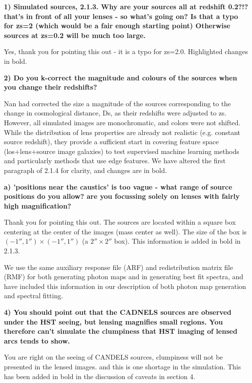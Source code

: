 \documentclass{article}
\begin{document}
\vspace{0.5cm}

{\bf 1) Simulated sources, 2.1.3. Why are your sources all at redshift 0.2?!? that's
in front of all your lenses - so what's going on? Is that a typo for zs=2
(which would be a fair enough starting point) Otherwise sources at zs=0.2
will be much too large.}

Yes, thank you for pointing this out - it is a typo for zs=2.0.
Highlighted changes in bold.


{\bf 
2) Do you k-correct the magnitude and colours of the sources when you
change their redshifts?
}

Nan had corrected the size a magnitude of the sources corresponding to
the change in cosmological distance, Ds, as their redshifts were
adjusted to zs.  However, all simulated images are monochromatic, and
colors were not shifted.  While the distribution of lens properties
are already not realistic (e.g. constant source redshift), they
provide a sufficient start in covering feature space (los+lens+source
image galaxies) to test supervised machine learning methods and
particularly methods that use edge features.  We have altered the
first paragraph of 2.1.4 for clarity, and changes are in bold.


{\bf 
a) 'positions near the caustics' is too vague - what range of source positions
do you allow? are you focussing solely on lenses with fairly high
magnification?
}

Thank you for pointing this out.  The sources are located within a
square box centering at the center of the images (mass center as
well). The size of the box is $(-1'', 1'')\times(-1'', 1'')$ (a
$2''\times2''$ box).  This information is added in bold in 2.1.3.

We use the same auxiliary response file (ARF) and redistribution matrix file
(RMF) for both generating photon maps and in generating best fit
spectra, and have included this information in our description of both
photon map generation and spectral fitting.

{\bf 4) You should point out that the CADNELS sources are observed
  under the HST seeing, but lensing magnifies small regions. You
  therefore can't simulate the clumpiness that HST imaging of lensed
  arcs tends to show.  }

You are right on the seeing of CANDELS sources, clumpiness will not be
presented in the lensed images. and this is one shortage in the
simulation.  This has been added in bold in the discussion of caveats
in section 4.
\end{document}
